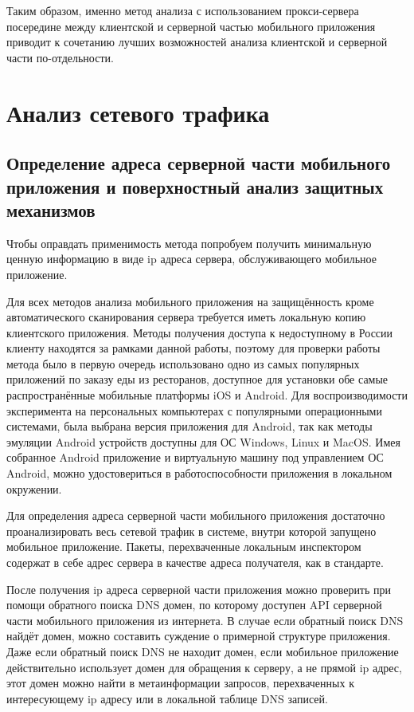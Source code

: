 Таким образом, именно метод анализа с использованием прокси-сервера посередине между клиентской и серверной частью мобильного приложения приводит к сочетанию лучших возможностей анализа клиентской и серверной части по-отдельности.

\section{Анализ сетевого трафика}

\subsection{Определение адреса серверной части мобильного приложения и поверхностный анализ защитных механизмов}

Чтобы оправдать применимость метода попробуем получить минимальную ценную информацию в виде ip адреса сервера, обслуживающего мобильное приложение.

Для всех методов анализа мобильного приложения на защищённость кроме автоматического сканирования сервера требуется иметь локальную копию клиентского приложения. Методы получения доступа к недоступному в России клиенту находятся за рамками данной работы, поэтому для проверки работы метода было в первую очередь использовано одно из самых популярных приложений по заказу еды из ресторанов, доступное для установки обе самые распространённые мобильные платформы iOS и Android. Для воспроизводимости эксперимента на персональных компьютерах с популярными операционными системами, была выбрана версия приложения для Android, так как методы эмуляции Android устройств доступны для ОС Windows, Linux и MacOS. Имея собранное Android приложение и виртуальную машину под управлением ОС Android, можно удостовериться в работоспособности приложения в локальном окружении.

Для определения адреса серверной части мобильного приложения достаточно проанализировать весь сетевой трафик в системе, внутри которой запущено мобильное приложение. Пакеты, перехваченные локальным инспектором содержат в себе адрес сервера в качестве адреса получателя, как в стандарте.

После получения ip адреса серверной части приложения можно проверить при помощи обратного поиска DNS домен, по которому доступен API серверной части мобильного приложения из интернета. В случае если обратный поиск DNS найдёт домен, можно составить суждение о примерной структуре приложения. Даже если обратный поиск DNS не находит домен, если мобильное приложение действительно использует домен для обращения к серверу, а не прямой ip адрес, этот домен можно найти в метаинформации запросов, перехваченных к интересующему ip адресу или в локальной таблице DNS записей.

